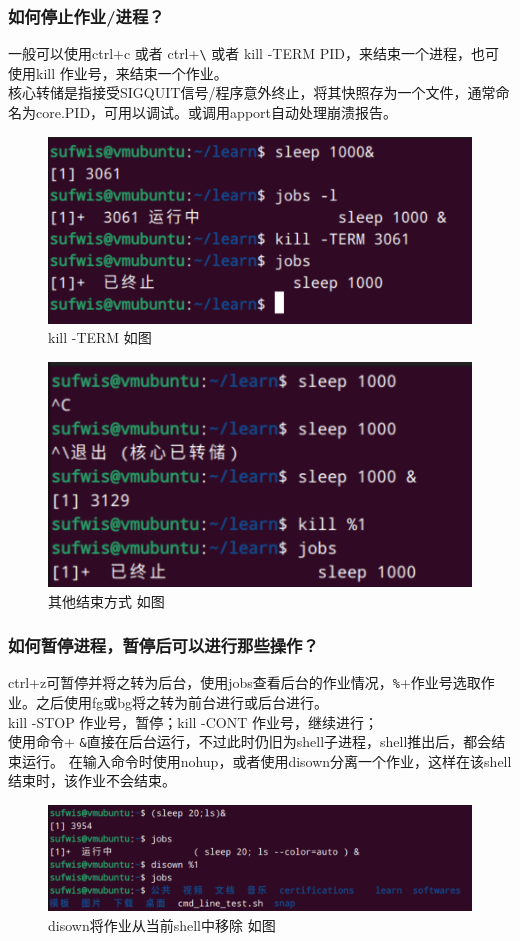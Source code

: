 \documentclass[UTF8]{ctexart}
\begin{document}
\subsubsection{如何停止作业/进程？}
一般可以使用ctrl+c 或者 ctrl+\verb|\| 或者 kill -TERM  PID，来结束一个进程，也可使用kill 作业号，来结束一个作业。\\
\indent 核心转储是指接受SIGQUIT信号/程序意外终止，将其快照存为一个文件，通常命名为core.PID，可用以调试。或调用apport自动处理崩溃报告。
\begin{figure}[H]
	\centering
	\includegraphics[width=0.7\linewidth]{figure/kill_TERM.png}
	\caption{kill -TERM 如图}
\end{figure}
\begin{figure}[H]
	\centering
	\includegraphics[width=0.7\linewidth]{figure/kill_other.png}
	\caption{其他结束方式 如图}
\end{figure}

\subsubsection{如何暂停进程，暂停后可以进行那些操作？}
ctrl+z可暂停并将之转为后台，使用jobs查看后台的作业情况，\verb|%|+作业号选取作业。之后使用fg或bg将之转为前台进行或后台进行。
\\
\indent kill -STOP 作业号，暂停；kill -CONT 作业号，继续进行；
\\
\indent 使用命令+ \verb|&|直接在后台运行，不过此时仍旧为shell子进程，shell推出后，都会结束运行。
在输入命令时使用nohup，或者使用disown分离一个作业，这样在该shell结束时，该作业不会结束。
\begin{figure}[H]
	\centering
	\includegraphics[width=0.7\linewidth]{figure/disown.png}
	\caption{disown将作业从当前shell中移除 如图}
\end{figure}
\end{document}

